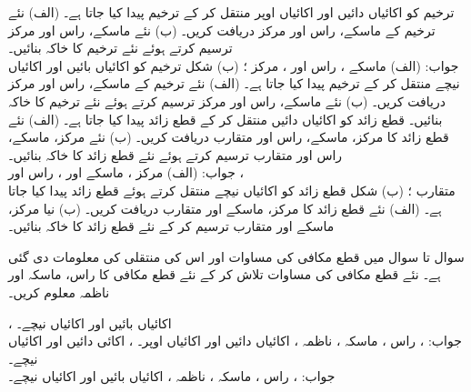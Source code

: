 ترخیم  کو  اکائیاں دائیں اور  اکائیاں اوپر منتقل کر کے ترخیم  پیدا کیا جاتا ہے۔ (الف) نئے ترخیم کے ماسکے، راس اور مرکز دریافت کریں۔ (ب) نئے ماسکے، راس اور مرکز ترسیم کرتے ہوئے نئے ترخیم کا خاکہ بنائیں۔\\
جواب:\quad
(الف) ماسکے ، راس  اور ، مرکز ؛ (ب) شکل 
ترخیم  کو  اکائیاں بائیں اور  اکائیاں نیچے منتقل کر کے
 ترخیم  پیدا کیا جاتا ہے۔ (الف) نئے ترخیم کے ماسکے، راس اور مرکز دریافت کریں۔ (ب) نئے ماسکے، راس اور مرکز ترسیم کرتے ہوئے نئے ترخیم کا خاکہ بنائیں۔
قطع زائد  کو  اکائیاں دائیں منتقل کر کے قطع زائد
  پیدا کیا جاتا ہے۔ (الف) نئے قطع زائد کا مرکز، ماسکے، راس اور متقارب دریافت کریں۔ (ب) نئے مرکز، ماسکے، راس اور متقارب ترسیم کرتے ہوئے نئے قطع زائد کا خاکہ بنائیں۔\\
جواب:\quad
(الف) مرکز ، ماسکے  اور ، راس  اور ،\\
 متقارب ؛  (ب) شکل 
قطع زائد  کو  اکائیاں نیچے منتقل کرتے ہوئے قطع زائد  پیدا کیا جاتا ہے۔ (الف) نئے قطع زائد کا مرکز، ماسکے اور متقارب دریافت کریں۔ (ب) نیا مرکز، ماسکے اور متقارب ترسیم کر کے نئے قطع زائد کا خاکہ بنائیں۔

سوال  تا سوال  میں قطع مکافی کی مساوات اور اس کی منتقلی کی معلومات دی گئی ہے۔ نئے قطع مکافی کی مساوات تلاش کر کے نئے قطع مکافی کا راس، ماسکہ اور ناظمہ معلوم کریں۔

، 
\quad
{} اکائیاں بائیں اور  اکائیاں  نیچے۔\\
جواب:\quad
{}، راس ، ماسکہ ، ناظمہ 
، 
\quad
{} اکائیاں دائیں اور  اکائیاں  اوپر۔
، 
\quad
{} اکائی دائیں اور  اکائیاں  نیچے۔\\
جواب:\quad
{}، راس ، ماسکہ ، ناظمہ 
، 
\quad
{} اکائیاں بائیں اور  اکائیاں  نیچے۔

